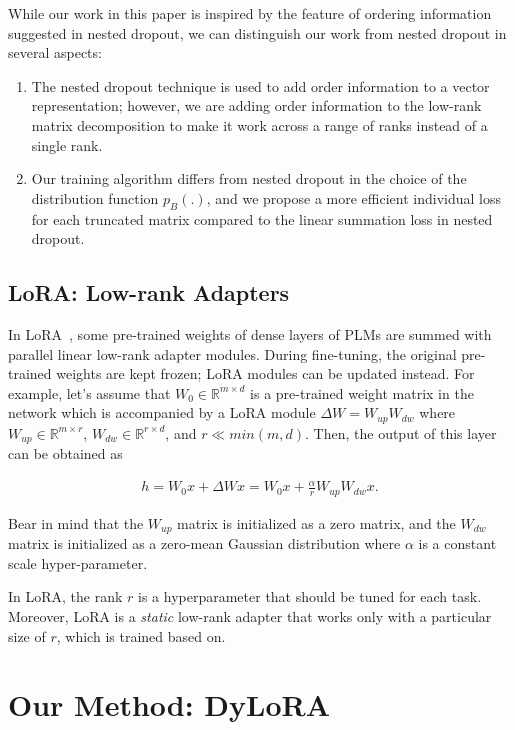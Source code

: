 While our work in this paper is inspired by the feature of ordering information suggested in nested dropout, we can distinguish our work from nested dropout in several aspects:

\begin{enumerate}
    \item  The nested dropout technique is used to add order information to a vector representation; however, we are adding order information to the low-rank matrix decomposition to make it work across a range of ranks instead of a single rank.
    \item Our training algorithm differs from nested dropout in the choice of the distribution function $p_B(.)$, and we propose a more efficient  individual loss for each truncated matrix compared to the linear summation loss in nested dropout. 
\end{enumerate}

\subsection{LoRA: Low-rank Adapters} In LoRA~\cite{hu2021lora}, some pre-trained weights of dense layers of PLMs are summed with parallel linear low-rank adapter modules. During fine-tuning, the original pre-trained weights are kept frozen; LoRA modules can be updated instead. For example, let's assume that $W_0 \in \mathbb{R}^{m\times d}$ is a pre-trained weight matrix in the network which is accompanied by a LoRA module $\Delta W = W_{up}W_{dw}$ where $W_{up}\in \mathbb{R}^{m\times r}$, $W_{dw}\in \mathbb{R}^{r\times d}$, and $r \ll min(m,d)$. Then, the output of this layer can be obtained as

\begin{equation}
\begin{split}
    h = W_0x + \Delta W x= W_0 x+ \frac{\alpha}{r}W_{up}W_{dw}x.
\end{split}
\end{equation}

Bear in mind that the $W_{up}$ matrix is initialized as a zero matrix, and the $W_{dw}$ matrix is initialized as a zero-mean Gaussian distribution where $\alpha$ is a constant scale hyper-parameter.

In LoRA, the rank $r$ is a hyperparameter that should be tuned for each task. Moreover, LoRA is a \textit{static} low-rank adapter that works only with a particular size of $r$, which is trained based on.

\section{Our Method: DyLoRA}

